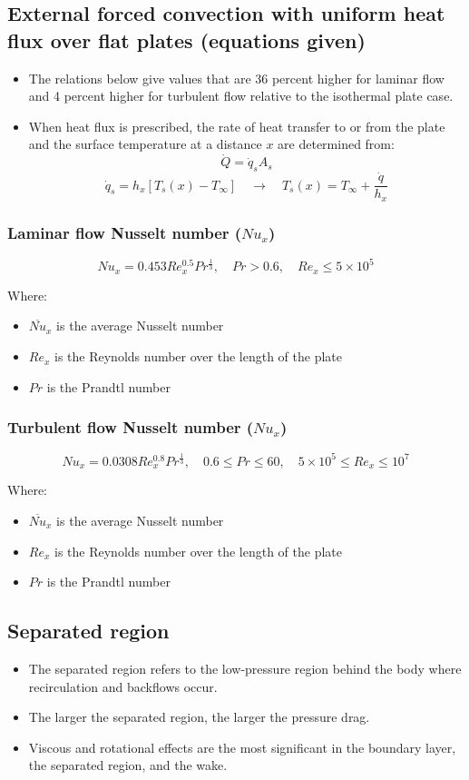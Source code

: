 \documentclass[11pt]{article}
\begin{document}
\subsection{External forced convection with uniform heat flux over flat plates (equations given)}
\label{sec:org293919e}
\begin{itemize}
\item The relations below give values that are 36 percent higher for laminar flow and 4 percent higher for turbulent flow relative to the isothermal plate case.
\item When heat flux is prescribed, the rate of heat transfer to or from the plate and the surface temperature at a distance \(x\) are determined from:
\[\dot{Q} = \dot{q}_s A_s\]
\[\dot{q}_s = h_x [T_s(x) - T_{\infty}] \quad \rightarrow \quad T_s (x) = T_{\infty} + \frac{\dot{q}}{h_x}\]
\end{itemize}

\subsubsection{Laminar flow Nusselt number (\(Nu_x\))}
\label{sec:org8ec5ed6}
\[Nu_x = 0.453 Re_x^{0.5} Pr^{\frac{1}{3}}, \quad Pr > 0.6, \quad Re_x \le 5 \times 10^5\]

Where:
\begin{itemize}
\item \(\overline{Nu}_x\) is the average Nusselt number
\item \(Re_x\) is the Reynolds number over the length of the plate
\item \(Pr\) is the Prandtl number
\end{itemize}

\subsubsection{Turbulent flow Nusselt number (\(Nu_x\))}
\label{sec:orgfa38ae6}
\[Nu_x = 0.0308 Re_x^{0.8} Pr^{\frac{1}{3}}, \quad 0.6 \le Pr \le 60, \quad 5 \times 10^5 \le Re_x \le 10^7\]

Where:
\begin{itemize}
\item \(\overline{Nu}_x\) is the average Nusselt number
\item \(Re_x\) is the Reynolds number over the length of the plate
\item \(Pr\) is the Prandtl number
\end{itemize}

\subsection{Separated region}
\label{sec:org84fa87d}
\begin{itemize}
\item The separated region refers to the low-pressure region behind the body where recirculation and backflows occur.
\item The larger the separated region, the larger the pressure drag.
\item Viscous and rotational effects are the most significant in the boundary layer, the separated region, and the wake.
\end{itemize}
\end{document}
